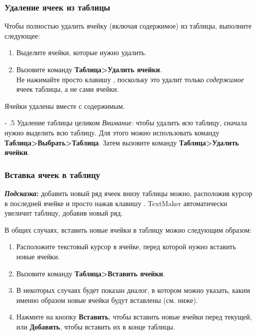 ﻿\documentclass[a4paper,10pt]{article}
\makeatletter
\renewcommand\paragraph{%
   \@startsection{paragraph}{4}{0mm}%
      {-\baselineskip}%
      {.5\baselineskip}%
      {\normalfont\normalsize\bfseries}}
\makeatother
\begin{document}
\subsubsection{Удаление ячеек из таблицы}
Чтобы полностью удалить ячейку (включая содержимое) из таблицы, выполните следующее:
\begin{enumerate}
 \item Выделите ячейки, которые нужно удалить.
 \item Вызовите команду \textbf{Таблица>Удалить ячейки}.\\
 Не нажимайте просто клавишу , поскольку это удалит только \textit{содержимое} ячеек таблицы, а не сами ячейки.
\end{enumerate}

Ячейки удалены вместе с содержимым.

\paragraph{Удаление таблицы целиком}
\textit{Внимание:} чтобы удалить \textit{всю} таблицу, сначала нужно выделить всю таблицу. Для этого можно использовать команду \textbf{Таблица>Выбрать>Таблица}. Затем вызовите команду \textbf{Таблица>Удалить ячейки}.

\subsubsection{Вставка ячеек в таблицу}
\begin{mdframed}[backgroundcolor=blue!10]
\textbf{\textit{Подсказка}:} добавить новый ряд ячеек внизу таблицы можно, расположив курсор в последней ячейке и просто нажав клавишу . TextMaker автоматически увеличит таблицу, добавив новый ряд.
\end{mdframed}

В общих случаях, вставить новые ячейки в таблицу можно следующим образом:
\begin{enumerate}
 \item Расположите текстовый курсор в ячейке, перед которой нужно вставить новые ячейки.
 \item Вызовите команду \textbf{Таблица>Вставить ячейки}.
 \item В некоторых случаях будет показан диалог, в котором можно указать, каким именно образом новые ячейки будут вставлены (см. ниже).
 \item Нажмите на кнопку \textbf{Вставить}, чтобы вставить новые ячейки перед текущей, или \textbf{Добавить}, чтобы вставить их в конце таблицы.
\end{enumerate}
\end{document}

